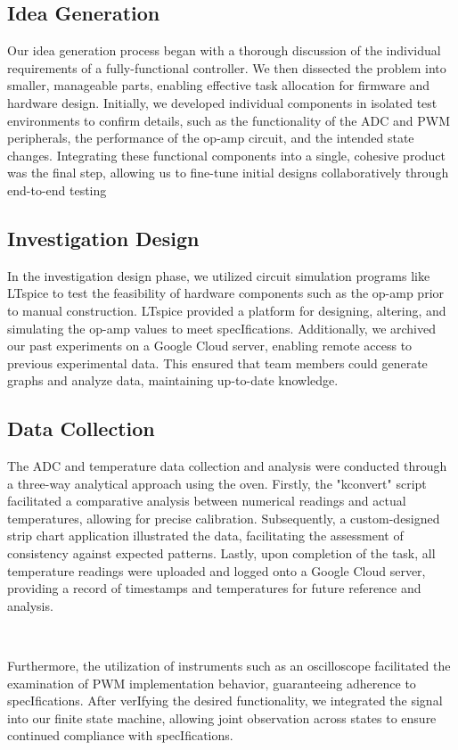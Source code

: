 \documentclass{article}
\begin{document}
\subsection{Idea Generation}
Our idea generation process began with a thorough discussion of the individual requirements of a fully-functional controller. We then dissected the problem into smaller, manageable parts, enabling effective task allocation for firmware and hardware design. Initially, we developed individual components in isolated test environments to confirm details, such as the functionality of the ADC and PWM peripherals, the performance of the op-amp circuit, and the intended state changes. Integrating these functional components into a single, cohesive product was the final step, allowing us to fine-tune initial designs collaboratively through end-to-end testing

\subsection{Investigation Design}
In the investigation design phase, we utilized circuit simulation programs like LTspice to test the feasibility of hardware components such as the op-amp prior to manual construction. LTspice provided a platform for designing, altering, and simulating the op-amp values to meet specIfications. Additionally, we archived our past experiments on a Google Cloud server, enabling remote access to previous experimental data. This ensured that team members could generate graphs and analyze data, maintaining up-to-date knowledge.

\subsection{Data Collection}
 The ADC and temperature data collection and analysis were conducted through a three-way analytical approach using the oven. Firstly, the "kconvert" script facilitated a comparative analysis between numerical readings and actual temperatures, allowing for precise calibration. Subsequently, a custom-designed strip chart application illustrated the data, facilitating the assessment of consistency against expected patterns. Lastly, upon completion of the task, all temperature readings were uploaded and logged onto a Google Cloud server, providing a record of timestamps and temperatures for future reference and analysis.

\

\noindent Furthermore, the utilization of instruments such as an oscilloscope facilitated the examination of PWM implementation behavior, guaranteeing adherence to specIfications. After verIfying the desired functionality, we integrated the signal into our finite state machine, allowing joint observation across states to ensure continued compliance with specIfications.
\end{document}
